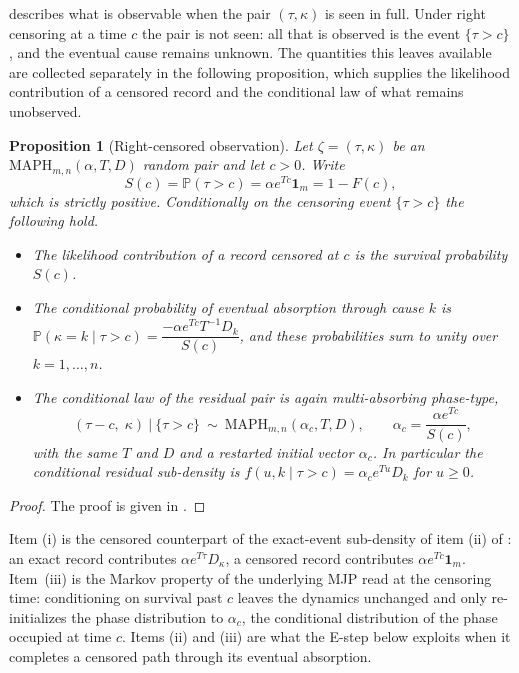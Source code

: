 \documentclass{article}
\newtheorem{proposition}{Proposition}
\newcommand{\Prob}{\mathbb{P}}
\newenvironment{aarevision}{}{}
\begin{document}
\begin{aarevision}
 describes what is observable when the pair $(\tau,\kappa)$ is seen in full. Under right censoring at a time $c$ the pair is not seen: all that is observed is the event $\{\tau>c\}$, and the eventual cause remains unknown. The quantities this leaves available are collected separately in the following proposition, which supplies the likelihood contribution of a censored record and the conditional law of what remains unobserved.

\begin{proposition}[Right-censored observation]
\label{prop:maph-censored}
Let $\zeta=(\tau,\kappa)$ be an $\text{MAPH}_{m,n}(\alpha,T,D)$ random pair and let $c>0$. Write
\[
S(c)=\Prob(\tau>c)=\alpha e^{Tc}\mathbf{1}_m = 1-F(c),
\]
which is strictly positive. Conditionally on the censoring event $\{\tau>c\}$ the following hold.
\begin{itemize}
    \item[(i)] The likelihood contribution of a record censored at $c$ is the survival probability $S(c)$.
    \item[(ii)] The conditional probability of eventual absorption through cause $k$ is
    $\Prob(\kappa = k \mid \tau > c) = \dfrac{-\alpha e^{Tc}T^{-1}D_k}{S(c)}$, and these probabilities sum to unity over $k=1,\ldots,n$.
    \item[(iii)] The conditional law of the residual pair is again multi-absorbing phase-type,
    \[
    (\tau-c,\;\kappa)\ \big|\ \{\tau>c\}\ \sim\ \text{MAPH}_{m,n}(\alpha_c,T,D),
    \qquad
    \alpha_c=\frac{\alpha e^{Tc}}{S(c)},
    \]
    with the same $T$ and $D$ and a restarted initial vector $\alpha_c$. In particular the conditional residual sub-density is $f(u,k\mid\tau>c)=\alpha_c e^{Tu}D_k$ for $u \ge 0$.
\end{itemize}
\end{proposition}
\begin{proof}
The proof is given in .
\end{proof}
%
Item (i) is the censored counterpart of the exact-event sub-density of item (ii) of : an exact record contributes $\alpha e^{T\tau}D_\kappa$, a censored record contributes $\alpha e^{Tc}\mathbf{1}_m$. Item~(iii) is the Markov property of the underlying MJP read at the censoring time: conditioning on survival past $c$ leaves the dynamics unchanged and only re-initializes the phase distribution to $\alpha_c$, the conditional distribution of the phase occupied at time $c$. Items (ii) and (iii) are what the E-step below exploits when it completes a censored path through its eventual absorption.
\end{aarevision}
\end{document}
